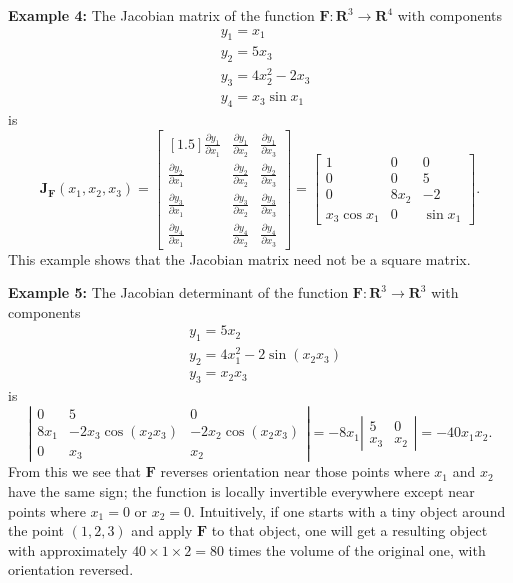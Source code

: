 \documentclass[13pt]{article}
\theoremstyle{definition}
\theoremstyle{remark}
\begin{document}
\textbf{Example 4:}
The Jacobian matrix of the function $\mathbf{F}: \mathbf{R}^3 \rightarrow \mathbf{R}^4$ with components
$$
\begin{aligned}
& y_1=x_1 \\
& y_2=5 x_3 \\
& y_3=4 x_2^2-2 x_3 \\
& y_4=x_3 \sin x_1
\end{aligned}
$$
is
\[
\mathbf{J}_{\mathbf{F}}\left(x_1, x_2, x_3\right)=\begin{bmatrix}[1.5]
\frac{\partial y_1}{\partial x_1} & \frac{\partial y_1}{\partial x_2} & \frac{\partial y_1}{\partial x_3} \\
\frac{\partial y_2}{\partial x_1} & \frac{\partial y_2}{\partial x_2} & \frac{\partial y_2}{\partial x_3} \\
\frac{\partial y_3}{\partial x_1} & \frac{\partial y_3}{\partial x_2} & \frac{\partial y_3}{\partial x_3} \\
\frac{\partial y_4}{\partial x_1} & \frac{\partial y_4}{\partial x_2} & \frac{\partial y_4}{\partial x_3}
\end{bmatrix}=\left[\begin{array}{ccc}
1 & 0 & 0 \\
0 & 0 & 5 \\
0 & 8 x_2 & -2 \\
x_3 \cos x_1 & 0 & \sin x_1
\end{array}\right] .
\]
This example shows that the Jacobian matrix need not be a square matrix.

\textbf{Example 5:}
The Jacobian determinant of the function $\mathbf{F}: \mathbf{R}^3 \rightarrow \mathbf{R}^3$ with components
$$
\begin{aligned}
& y_1=5 x_2 \\
& y_2=4 x_1^2-2 \sin \left(x_2 x_3\right) \\
& y_3=x_2 x_3
\end{aligned}
$$
is
$$
\left|\begin{array}{ccc}
0 & 5 & 0 \\
8 x_1 & -2 x_3 \cos \left(x_2 x_3\right) & -2 x_2 \cos \left(x_2 x_3\right) \\
0 & x_3 & x_2
\end{array}\right|=-8 x_1\left|\begin{array}{cc}
5 & 0 \\
x_3 & x_2
\end{array}\right|=-40 x_1 x_2 .
$$
From this we see that $\mathbf{F}$ reverses orientation near those points where $x_1$ and $x_2$ have the same sign; the function is locally invertible everywhere except near points where $x_1=0$ or $x_2=0$. Intuitively, if one starts with a tiny object around the point $(1,2,3)$ and apply $\mathbf{F}$ to that object, one will get a resulting object with approximately $40 \times 1 \times 2=80$ times the volume of the original one, with orientation reversed.
\end{document}
